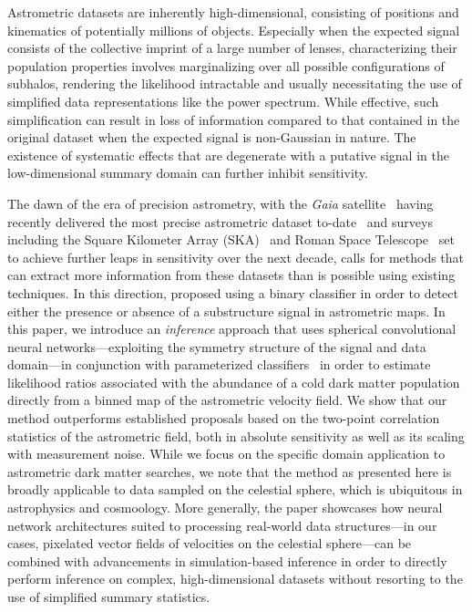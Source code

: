 \documentclass[twocolumn]{aastex631}
\begin{document}
Astrometric datasets are inherently high-dimensional, consisting of positions and kinematics of potentially millions of objects. Especially when the expected signal consists of the collective imprint of a large number of lenses, characterizing their population properties involves marginalizing over all possible configurations of subhalos, rendering the likelihood intractable and usually necessitating the use of simplified data representations like the power spectrum. While effective, such simplification can result in loss of information compared to that contained in the original dataset when the expected signal is non-Gaussian in nature. The existence of systematic effects that are degenerate with a putative signal in the low-dimensional summary domain can further inhibit sensitivity. 

The dawn of the era of precision astrometry, with the \emph{Gaia} satellite~\citep{2016A&A...595A...1G} having recently delivered the most precise astrometric dataset to-date~\citep{2018A&A...616A...1G,2018A&A...616A...2L,2021A&A...649A...1G} and surveys including the Square Kilometer Array (SKA)~\citep{Fomalont:2004hr,Jarvis:2015tqa} and Roman Space Telescope~\citep{2019JATIS...5d4005W} set to achieve further leaps in sensitivity over the next decade, calls for methods that can extract more information from these datasets than is possible using existing techniques. In this direction, \citet{Vattis:2020kaa} proposed using a binary classifier in order to detect either the presence or absence of a substructure signal in astrometric maps. In this paper, we introduce an \emph{inference} approach that uses spherical convolutional neural networks---exploiting the symmetry structure of the signal and data domain---in conjunction with parameterized classifiers~\citep{Cranmer:2015bka,Baldi:2016fzo} in order to estimate likelihood ratios associated with the abundance of a cold dark matter population directly from a binned map of the astrometric velocity field. 
We show that our method outperforms established proposals based on the two-point correlation statistics of the astrometric field, both in absolute sensitivity as well as its scaling with measurement noise. 
{While we focus on the specific domain application to astrometric dark matter searches, we note that the method as presented here is broadly applicable to data sampled on the celestial sphere, which is ubiquitous in astrophysics and cosmoology. More generally, the paper showcases how neural network architectures suited to processing real-world data structures---in our cases, pixelated vector fields of velocities on the celestial sphere---can be combined with advancements in simulation-based inference in order to directly perform inference on complex, high-dimensional datasets without resorting to the use of simplified summary statistics.}
\end{document}
